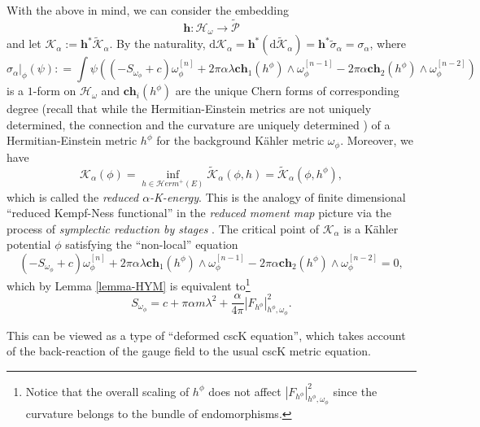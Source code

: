 \documentclass[10pt, letterpaper]{amsart}
\theoremstyle{plain}
\theoremstyle{definition}
\numberwithin{equation}{section}
\begin{document}
With the above in mind, we can consider the embedding
\[
\mathbf{h}: \mathcal{H}_\omega\rightarrow \widetilde{\mathcal{P}}
\]
and let $\mathcal{K}_\alpha:=\mathbf{h}^*\widetilde{\mathcal{K}}_\alpha$. By the naturality, $\mathrm{d}\mathcal{K}_\alpha=\mathbf{h}^*\left(\mathrm{d}\widetilde{\mathcal{K}}_\alpha\right) =\mathbf{h}^*\widetilde{\sigma}_\alpha=\sigma_\alpha$, where 
\[
\sigma_\alpha|_\phi \left(\psi\right)
: = 
\int \psi \left( \left( -S_{\omega_\phi}+c\right)\omega_\phi^{[n]} 
+ 
2\pi\alpha \lambda \mathbf{ch}_1\left(h^\phi\right) \wedge \omega_\phi^{[n-1]} 
- 2\pi\alpha  \mathbf{ch}_2\left(h^\phi\right)\wedge\omega_\phi^{[n-2]}
\right)
\] 
is a $1$-form on $\mathcal{H}_\omega$ and $\mathbf{ch}_i\left(h^\phi\right)$ are the unique Chern forms of corresponding degree (recall that while the Hermitian-Einstein metrics are not uniquely determined, the connection and the curvature are uniquely determined \cite[Proposition 6.3.37]{Ko})  of a Hermitian-Einstein metric $h^\phi$ for the background K\"ahler metric $\omega_\phi$.  Moreover, we have 
\begin{equation}
\mathcal{K}_\alpha\left(\phi\right)
= 
\inf_{h\in \mathcal{H}erm^+\left(E\right)}\widetilde{\mathcal{K}}_\alpha\left(\phi, h\right)
= 
\widetilde{\mathcal{K}}_\alpha\left(\phi, h^\phi\right),
\end{equation}
which is called the \emph{reduced $\alpha$-K-energy}. This is the analogy of finite dimensional ``reduced Kempf-Ness functional'' in the \emph{reduced moment map} picture via the process of \emph{symplectic reduction by stages} \cite{AllGV}. The critical point of $\mathcal{K}_\alpha$ is a K\"ahler potential $\phi$ satisfying the ``non-local'' equation 
\begin{equation}
\label{eqn:deformedCSCK}
\left( -S_{\omega_\phi}+c\right)\omega_\phi^{[n]} 
+ 
2\pi\alpha \lambda \mathbf{ch}_1\left(h^\phi\right) \wedge \omega_\phi^{[n-1]} 
-
2\pi\alpha \mathbf{ch}_2\left(h^\phi\right)\wedge \omega_\phi^{[n-2]}
=
0,
\end{equation}
which by Lemma \ref{lemma-HYM} is equivalent to\footnote{Notice that the overall scaling of $h^\phi$ does not affect $\left|F_{h^\phi}\right|^2_{h^\phi,\omega_{\phi}}$ since the curvature belongs to the bundle of endomorphisms.}
\begin{equation}
S_{\omega_\phi}
= 
c+ \pi \alpha m\lambda^2 
+ \frac{\alpha}{4\pi}\left|F_{h^\phi}\right|^2_{h^\phi,\omega_{\phi}}.
\end{equation}

This can be viewed as a type of ``deformed cscK equation'', which takes account of the back-reaction of the gauge field to the usual cscK metric equation. \\
\end{document}
